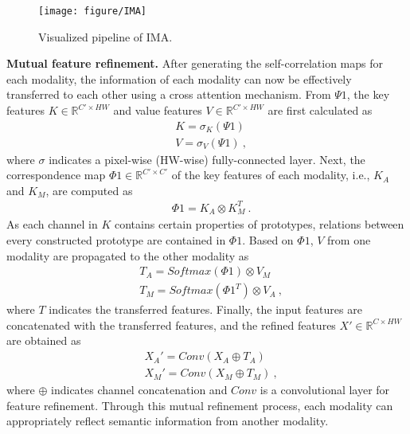 \documentclass[10pt,twocolumn,letterpaper]{article}
\begin{document}
\begin{figure}[t]
\centering
\texttt{[image: figure/IMA]}
\caption{Visualized pipeline of IMA.}
\label{figure3}
\end{figure}




\vspace{1mm}
\noindent\textbf{Mutual feature refinement.} After generating the self-correlation maps for each modality, the information of each modality can now be effectively transferred to each other using a cross attention mechanism. From $\Psi1$, the key features $K \in \mathbb{R}^{C' \times HW}$ and value features $V \in \mathbb{R}^{C' \times HW}$ are first calculated as
\begin{align}
&K = \sigma_K(\Psi1)\nonumber\\
&V = \sigma_V(\Psi1)~,
\end{align}
where $\sigma$ indicates a pixel-wise (HW-wise) fully-connected layer. Next, the correspondence map $\Phi1 \in \mathbb{R}^{C' \times C'}$ of the key features of each modality, i.e., $K_A$ and $K_M$, are computed as
\begin{align}
&\Phi1 = K_A \otimes K_M^{T}~.
\end{align}
As each channel in $K$ contains certain properties of prototypes, relations between every constructed prototype are contained in $\Phi1$. Based on $\Phi1$, $V$ from one modality are propagated to the other modality as
\begin{align}
&T_A = Softmax(\Phi1) \otimes V_M\nonumber\\
&T_M = Softmax(\Phi1^{T}) \otimes V_A~,
\end{align}
where $T$ indicates the transferred features. Finally, the input features are concatenated with the transferred features, and the refined features $X' \in \mathbb{R}^{C \times HW}$ are obtained as
\begin{align}
&X_A' = Conv(X_A \oplus T_A)\nonumber\\
&X_M' = Conv(X_M \oplus T_M)~,
\end{align}
where $\oplus$ indicates channel concatenation and $Conv$ is a convolutional layer for feature refinement. Through this mutual refinement process, each modality can appropriately reflect semantic information from another modality.
\end{document}
